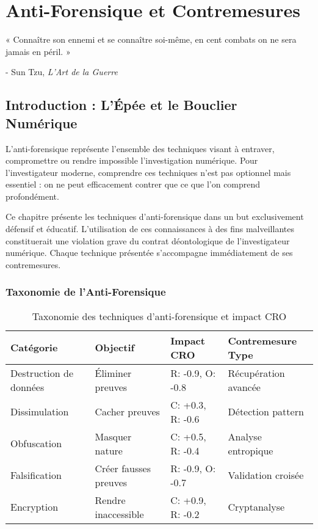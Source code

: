 \chapter{Anti-Forensique et Contremesures}

\epigraph{« Connaître son ennemi et se connaître soi-même, en cent combats on ne sera jamais en péril. »}{- Sun Tzu, \textit{L'Art de la Guerre}}

\section{Introduction : L'Épée et le Bouclier Numérique}

L'anti-forensique représente l'ensemble des techniques visant à entraver, compromettre ou rendre impossible l'investigation numérique. Pour l'investigateur moderne, comprendre ces techniques n'est pas optionnel mais essentiel : on ne peut efficacement contrer que ce que l'on comprend profondément.

\begin{tcolorbox}[colback=red!5!white,colframe=red!75!black,title=Avertissement Déontologique]
Ce chapitre présente les techniques d'anti-forensique dans un but exclusivement défensif et éducatif. L'utilisation de ces connaissances à des fins malveillantes constituerait une violation grave du contrat déontologique de l'investigateur numérique. Chaque technique présentée s'accompagne immédiatement de ses contremesures.
\end{tcolorbox}

\subsection{Taxonomie de l'Anti-Forensique}

\begin{table}[h]
\centering
\begin{tabular}{|l|l|l|l|}
\hline
\textbf{Catégorie} & \textbf{Objectif} & \textbf{Impact CRO} & \textbf{Contremesure Type} \\
\hline
Destruction de données & Éliminer preuves & R: -0.9, O: -0.8 & Récupération avancée \\
Dissimulation & Cacher preuves & C: +0.3, R: -0.6 & Détection pattern \\
Obfuscation & Masquer nature & C: +0.5, R: -0.4 & Analyse entropique \\
Falsification & Créer fausses preuves & R: -0.9, O: -0.7 & Validation croisée \\
Encryption & Rendre inaccessible & C: +0.9, R: -0.2 & Cryptanalyse \\
\hline
\end{tabular}
\caption{Taxonomie des techniques d'anti-forensique et impact CRO}
\end{table}

